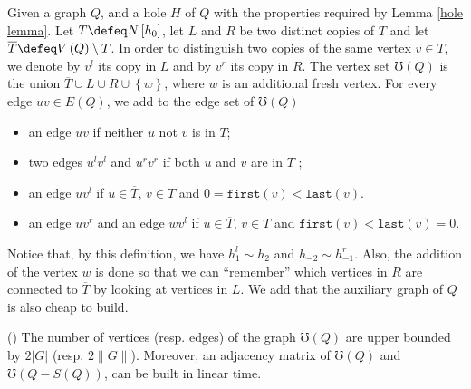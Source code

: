 \documentclass{article}
\begin{document}
    \begin{defn} \label{aux graph}
        Given a graph $Q$, 
        and a hole $H$ of $Q$ 
        with the properties
        required by Lemma \ref{hole lemma}. Let
        $T \defeq N\left[h_0\right]$,
        let $L$ and $R$ be two distinct
        copies of $T$ and
        let $\overline{T} \defeq V\left(Q\right) \setminus T$.
        In order to distinguish
        two copies of the same
        vertex $v \in T$,
        we denote by $v^{l}$ 
        its copy in $L$ 
        and by $v^{r}$ its 
        copy in $R$.
        The vertex set $\mho\left(Q\right)$
        is the union $\overline{T} \cup L \cup R \cup \left\{w\right\}$,
        where $w$ is an additional fresh vertex.
        For every edge $uv \in E\left(Q\right)$,
        we add to the edge set
        of $\mho\left(Q\right)$
        \begin{itemize}
            \item an edge $uv$ if neither $u$ not $v$ is in $T$;
            \item two edges $u^{l}v^{l}$ and $u^{r}v^{r}$ 
                if both $u$ and $v$ are in $T$ ;
            \item an edge $uv^{l}$ if $u \in \overline{T}$,
                $v \in T$ and $0 = \texttt{first}\left(v\right)
                < \texttt{last}\left(v\right)$.
            \item an edge $uv^{r}$ and
                an edge $wv^{l}$ 
                if $u \in \overline{T}$,
            $v \in T$ and $\texttt{first}\left(v\right)
            < \texttt{last}\left(v\right) = 0$.
        \end{itemize}
    \end{defn}
    
    Notice that, by this definition, 
    we have $h_1^{l} \sim h_{2}$ and
    $h_{-2} \sim h_{-1}^{r}$.
    Also, the addition
    of the vertex $w$ is done so that 
    we can ``remember'' 
    which vertices in $R$ are
    connected to $\overline{T}$ 
    by looking at vertices in $L$.
    We add that the auxiliary graph of $Q$ is also
    cheap to build. 

    \begin{prop} (\cite{main})
        The number of vertices (resp. edges) of the graph
        $\mho\left(Q\right)$ are upper bounded 
        by $2 \left|G\right|$ (resp. $2 \|G\|$).
        Moreover, an adjacency matrix of $\mho\left(Q\right)$
        and $\mho\left(Q - S\left(Q\right)\right)$,
        can be built in linear time.
    \end{prop}
\end{document}
